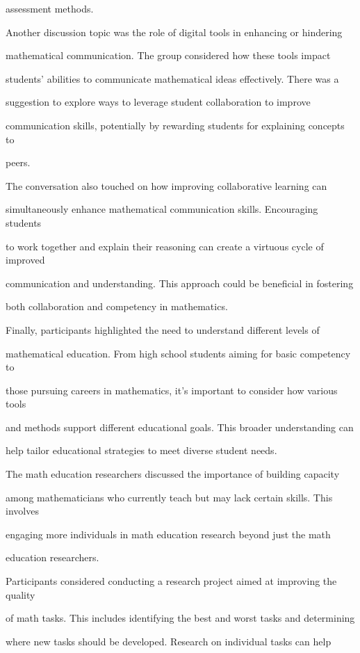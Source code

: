 \documentclass[11pt]{article}
\begin{document}
assessment methods.

Another discussion topic was the role of digital tools in enhancing or hindering

mathematical communication. The group considered how these tools impact

students' abilities to communicate mathematical ideas effectively. There was a

suggestion to explore ways to leverage student collaboration to improve

communication skills, potentially by rewarding students for explaining concepts to

peers.

The conversation also touched on how improving collaborative learning can

simultaneously enhance mathematical communication skills. Encouraging students

to work together and explain their reasoning can create a virtuous cycle of improved

communication and understanding. This approach could be beneficial in fostering

both collaboration and competency in mathematics.

Finally, participants highlighted the need to understand different levels of

mathematical education. From high school students aiming for basic competency to

those pursuing careers in mathematics, it's important to consider how various tools

and methods support different educational goals. This broader understanding can

help tailor educational strategies to meet diverse student needs.

The math education researchers discussed the importance of building capacity

among mathematicians who currently teach but may lack certain skills. This involves

engaging more individuals in math education research beyond just the math

education researchers.

Participants considered conducting a research project aimed at improving the quality

of math tasks. This includes identifying the best and worst tasks and determining

where new tasks should be developed. Research on individual tasks can help
\end{document}
